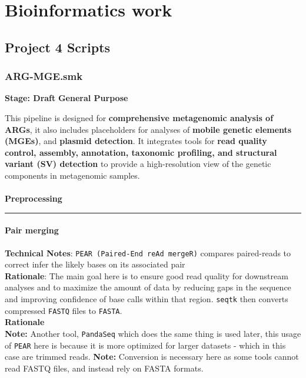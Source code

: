 \documentclass[11pt]{report}
\begin{document}
\pagestyle{fancy}
\fancyhf{}
\fancyhead[C]{\leftmark}  %
\fancyhead[R]{\thepage}


\part{Bioinformatics work}

\chapter{Project 4 Scripts}



\setcounter{section}{0}
\setcounter{subsection}{0}

\linenumbers*
\section{ARG-MGE.smk}
\textbf{Stage: Draft}   
\textbf{General Purpose}

This pipeline is designed for \textbf{comprehensive metagenomic analysis of ARGs}, it also includes placeholders for analyses of \textbf{mobile genetic elements (MGEs)}, and \textbf{plasmid detection}. It integrates tools for \textbf{read quality control, assembly, annotation, taxonomic profiling, and structural variant (SV) detection} to provide a high-resolution view of the genetic components in metagenomic samples.
\\
\\
\textbf{Preprocessing} \\
\rule{\linewidth}{0.5mm}
\subsection{Pair merging}
\textbf{Technical Notes}: \texttt{PEAR (Paired-End reAd mergeR)} compares paired-reads to correct infer the likely  bases on its associated pair\\
\textbf{Rationale}: The main goal here is to ensure good read quality for downstream analyses and to maximize the amount of data by reducing gaps in the sequence and improving confidence of base calls within that region. \texttt{seqtk} then converts compressed \texttt{FASTQ} files to \texttt{FASTA}. \\
\textbf{Rationale}\\
\textbf{Note:} Another tool, \texttt{PandaSeq} which does the same thing is used later, this usage of \texttt{PEAR} here is because it is more optimized for larger datasets - which in this case are trimmed reads.
\textbf{Note:} Conversion is necessary here as some tools cannot read FASTQ files, and instead rely on FASTA formats.
\end{document}
